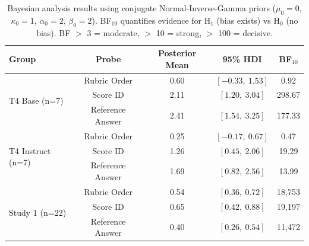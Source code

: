 \begin{table}[h]
\centering\small
\caption{Bayesian analysis results using conjugate Normal-Inverse-Gamma priors
($\mu_0=0$, $\kappa_0=1$, $\alpha_0=2$, $\beta_0=2$).
BF$_{10}$ quantifies evidence for H$_1$ (bias exists) vs H$_0$ (no bias).
BF $>$ 3 = moderate, $>$ 10 = strong, $>$ 100 = decisive.}
\label{tab:bayesian}
\begin{tabular}{lcccc}
\toprule
\textbf{Group} & \textbf{Probe} & \textbf{Posterior Mean} & \textbf{95\% HDI} & \textbf{BF$_{10}$} \\
\midrule
\multirow{3}{*}{T4 Base (n=7)}
 & Rubric Order & 0.60 & $[-0.33,\ 1.53]$ & 0.92 \\
 & Score ID & 2.11 & $[1.20,\ 3.04]$ & 298.67 \\
 & Reference Answer & 2.41 & $[1.54,\ 3.25]$ & 177.33 \\
\midrule
\multirow{3}{*}{T4 Instruct (n=7)}
 & Rubric Order & 0.25 & $[-0.17,\ 0.67]$ & 0.47 \\
 & Score ID & 1.26 & $[0.45,\ 2.06]$ & 19.29 \\
 & Reference Answer & 1.69 & $[0.82,\ 2.56]$ & 13.99 \\
\midrule
\multirow{3}{*}{Study 1 (n=22)}
 & Rubric Order & 0.54 & $[0.36,\ 0.72]$ & 18,753 \\
 & Score ID & 0.65 & $[0.42,\ 0.88]$ & 19,197 \\
 & Reference Answer & 0.40 & $[0.26,\ 0.54]$ & 11,472 \\
\bottomrule
\end{tabular}
\end{table}
